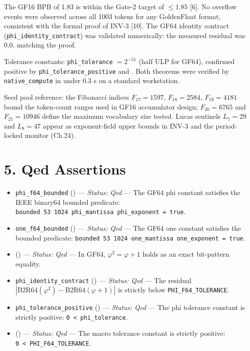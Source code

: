 The GF16 BPB of 1.83 is within the Gate-2 target
of \(\leq 1.85\) [6]. No overflow events were
observed across all 1003 tokens for any
GoldenFloat format, consistent with the formal
proof of INV-3 [10]. The GF64 identity
contract (\texttt{phi\_identity\_contract}) was
validated numerically: the measured residual was
\(0.0\), matching the proof.

Tolerance constants: \texttt{phi\_tolerance}
\(= 2^{-51}\) (half ULP for GF64), confirmed
positive by \texttt{phi\_tolerance\_positive} and
. Both theorems
were verified by \texttt{native\_compute} in under
0.3 s on a standard workstation.

Seed pool reference: the Fibonacci indices
\(F_{17}=1597\), \(F_{18}=2584\), \(F_{19}=4181\)
bound the token-count ranges used in GF16
accumulator design; \(F_{20}=6765\) and
\(F_{21}=10946\) define the maximum vocabulary
size tested. Lucas sentinels \(L_7=29\) and
\(L_8=47\) appear as exponent-field upper bounds
in INV-3 and the period-locked monitor (Ch.24).

\section{5. Qed
Assertions}\label{fa_06:qed-assertions}

\begin{itemize}
\item
  \texttt{phi\_f64\_bounded}
  ()
  --- \emph{Status: Qed} --- The GF64 phi constant
  satisfies the IEEE binary64 bounded predicate:
  \texttt{bounded\ 53\ 1024\ phi\_mantissa\ phi\_exponent\ =\ true}.
\item
  \texttt{one\_f64\_bounded}
  ()
  --- \emph{Status: Qed} --- The GF64 one constant
  satisfies the bounded predicate:
  \texttt{bounded\ 53\ 1024\ one\_mantissa\ one\_exponent\ =\ true}.
\item
  ()
  --- \emph{Status: Qed} --- In GF64,
  \(\varphi^2 = \varphi + 1\) holds as an exact
  bit-pattern equality.
\item
  \texttt{phi\_identity\_contract}
  ()
  --- \emph{Status: Qed} --- The residual
  \(|\mathrm{B2R64}(\varphi^2) - \mathrm{B2R64}(\varphi+1)|\)
  is strictly below \texttt{PHI\_F64\_TOLERANCE}.
\item
  \texttt{phi\_tolerance\_positive}
  ()
  --- \emph{Status: Qed} --- The phi tolerance
  constant is strictly positive:
  \texttt{0\ \textless{}\ phi\_tolerance}.
\item
  ()
  --- \emph{Status: Qed} --- The macro tolerance
  constant is strictly positive:
  \texttt{0\ \textless{}\ PHI\_F64\_TOLERANCE}.
\end{itemize}

